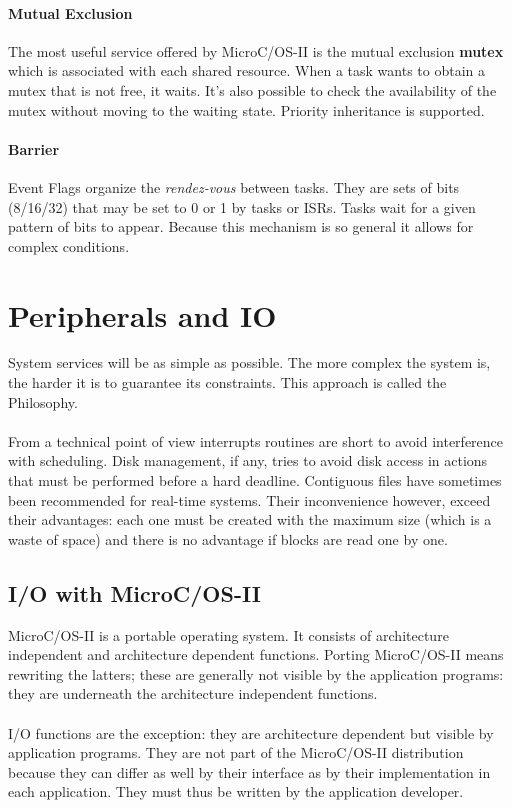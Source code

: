 \documentclass[../main.tex]{subfiles}
\begin{document}
\paragraph{Mutual Exclusion} The most useful service offered by MicroC/OS-II is the mutual exclusion \textbf{mutex} which is associated with each shared resource. When a task wants to obtain a mutex that is not free, it waits. It's also possible to check the availability of the mutex without moving to the waiting state. Priority inheritance is supported.

\paragraph{Barrier} Event Flags organize the \textit{rendez-vous} between tasks. They are sets of bits (8/16/32) that may be set to 0 or 1 by tasks or ISRs. Tasks wait for a given pattern of bits to appear. Because this mechanism is so general it allows for complex conditions.

\section{Peripherals and IO}
System services will be as simple as possible.
The more complex the system is, the harder it is to guarantee its constraints.
This approach is called the  Philosophy.
\\\\
From a technical point of view interrupts routines are short to avoid interference with scheduling. Disk management, if any, tries to avoid disk access in actions that must be performed before a hard deadline. Contiguous files have sometimes been recommended for real-time systems. Their inconvenience however, exceed their advantages: each one must be created with the maximum size (which is a waste of space) and there is no advantage if blocks are read one by one.

\subsection{I/O with MicroC/OS-II}
MicroC/OS-II is a portable operating system. It consists of architecture independent and architecture dependent functions. Porting MicroC/OS-II means rewriting the latters; these are generally not visible by the application programs: they are underneath the architecture independent functions.
\\\\
I/O functions are the exception: they are architecture dependent but visible by application programs. They are not part of the MicroC/OS-II distribution because they can differ as well by their interface as by their implementation in each application. They must thus be written by the application developer.
\end{document}
